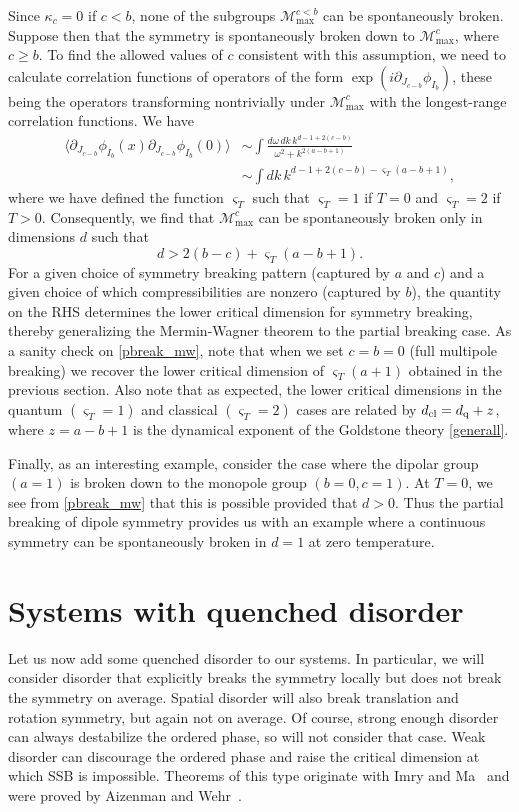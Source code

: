 \documentclass[pra,aps,twocolumn, amsfonts,amsmath,amssymb,nofootinbib,superscriptaddress]{revtex4-2}
\renewcommand{\max}{\text{max}}
\newcommand{\mmax}[1]{\mathcal{M}^{#1}_\max}
\newcommand\be            {\begin{equation}}
\newcommand\ee            {\end{equation}}
\newcommand\ba            {\begin{aligned}}
\newcommand\ea            {\end{aligned}}
\newcommand{\p}{\partial}
\begin{document}
Since $\kappa_c=0$ if $c<b$, none of the subgroups $\mmax {c<b}$ can be spontaneously broken. Suppose then that the symmetry is spontaneously broken down to $\mmax {c}$, where $c\geq b$. To find the allowed values of $c$ consistent with this assumption, we need to calculate correlation functions of operators of the form $\exp(i\p_{J_{c-b}}\phi_{I_b})$, these being the operators transforming nontrivially under $\mmax c$ with the longest-range correlation functions. We have 
\be\ba \langle \p_{J_{c-b}}\phi_{I_b}(x) \p_{J_{c-b}}\phi_{I_b}(0)\rangle & \sim \int \frac{d\omega \, dk\, k^{d-1+2(c-b)}}{\omega^2 + k^{2(a-b+1)}} \\ 
& \sim \int dk\, k^{d-1+2(c-b) - \varsigma_T(a-b+1)}, \ea\ee 
where we have defined the function $\varsigma_T$ such that $\varsigma_T = 1$ if $T=0$ and $\varsigma_T = 2$ if $T>0$. Consequently, we find that $\mmax c$ can be spontaneously broken only in dimensions $d$ such that 
\be \label{pbreak_mw} d>2(b-c) + \varsigma_T(a-b+1).\ee 
For a given choice of symmetry breaking pattern (captured by $a$ and $c$) and a given choice of which compressibilities are nonzero (captured by $b$), the quantity on the RHS determines the lower critical dimension for symmetry breaking, thereby generalizing the Mermin-Wagner theorem to the partial breaking case. 
As a sanity check on \eqref{pbreak_mw}, note that when we set $c=b=0$ (full multipole breaking) we recover the lower critical dimension of $\varsigma_T(a+1)$ obtained in the previous section. Also note that as expected, the lower critical dimensions in the quantum $(\varsigma_T = 1)$ and classical $(\varsigma_T = 2)$ cases are related by $d_{\rm cl} = d_{\rm q} + z$, where $z=a-b+1$ is the dynamical exponent of the Goldstone theory \eqref{generall}. 

Finally, as an interesting example, consider the case where the dipolar group $(a=1)$ is broken down to the monopole group $(b=0,c=1)$. At $T=0$, we see from \eqref{pbreak_mw} that this is possible provided that $d>0$. Thus the partial breaking of dipole symmetry provides us with an example where a continuous symmetry can be spontaneously broken in $d=1$ at zero temperature. 

\section{Systems with quenched disorder} \label{sec:disord}

Let us now add some quenched disorder to our systems. In particular, we will consider disorder that explicitly breaks the symmetry locally but does not break the symmetry on average. Spatial disorder will also break translation and rotation symmetry, but again not on average. Of course, strong enough disorder can always destabilize the ordered phase, so will not consider that case. Weak disorder can discourage the ordered phase and raise the critical dimension at which SSB is impossible. Theorems of this type originate with Imry and Ma~\cite{ImryMa} and were proved by Aizenman and Wehr~\cite{Aizenman}.
\end{document}
